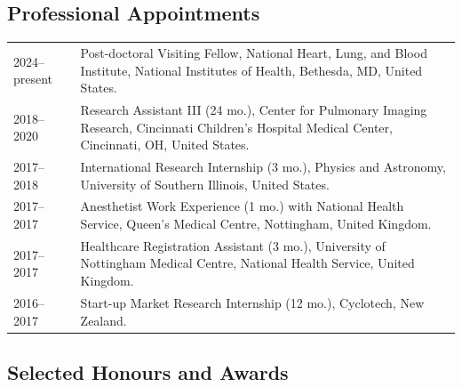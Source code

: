 \documentclass[12pt,]{scrartcl}
\begin{document}
\subsection{Professional Appointments}\label{appointments}

\begin{table}[h!]
{\def\arraystretch{1.5}\tabcolsep=0pt
\begin{tabular}{p{0.15\linewidth}p{0.85\linewidth}}

  2024--present & Post-doctoral Visiting Fellow, National Heart, Lung, and Blood Institute, National Institutes of Health, Bethesda, MD, United States. \\
  
  2018--2020 & Research Assistant III (24 mo.), Center for Pulmonary Imaging Research, Cincinnati Children's Hospital Medical Center, Cincinnati, OH, United States. \\
    
  2017--2018 & International Research Internship (3 mo.), Physics and Astronomy, University of Southern Illinois, United States. \\

  2017--2017 & Anesthetist Work Experience (1 mo.) with National Health Service, Queen's Medical Centre, Nottingham, United Kingdom. \\
  
  2017--2017 & Healthcare Registration Assistant (3 mo.), University of Nottingham Medical Centre, National Health Service, United Kingdom.  \\
  
  2016--2017 & Start-up Market Research Internship (12 mo.), Cyclotech, New Zealand.  \\

  
\end{tabular}%
}
\end{table}

\newpage

\subsection{Selected Honours and
Awards}\label{selected-honours-and-awards}
\end{document}
